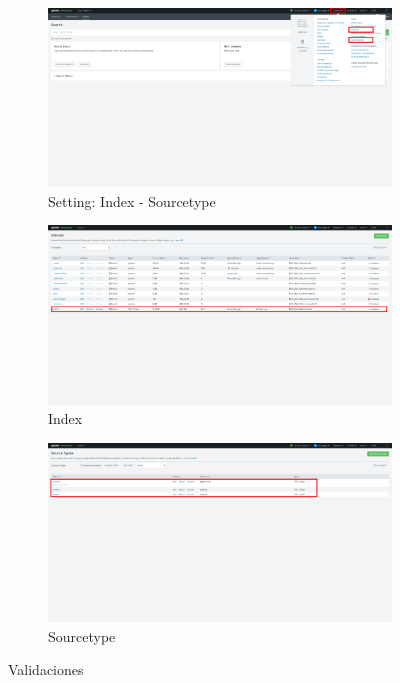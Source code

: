 \documentclass[a4paper]{article}
\begin{document}
\begin{figure}[h!]
  \centering
  \begin{subfigure}[b]{0.49\linewidth}
    \includegraphics[width=\linewidth]{img/f.png}
     \caption{\color{text} Setting: Index - Sourcetype}
  \end{subfigure}
  \begin{subfigure}[b]{0.49\linewidth}
    \includegraphics[width=\linewidth]{img/d.png}
    \caption{\color{text} Index}
  \end{subfigure}
  \begin{subfigure}[b]{0.49\linewidth}
    \includegraphics[width=\linewidth]{img/e.png}
    \caption{\color{text} Sourcetype}
  \end{subfigure}
  \caption{\color{text} Validaciones}
  \label{fig:validacion}
\end{figure}
\end{document}
